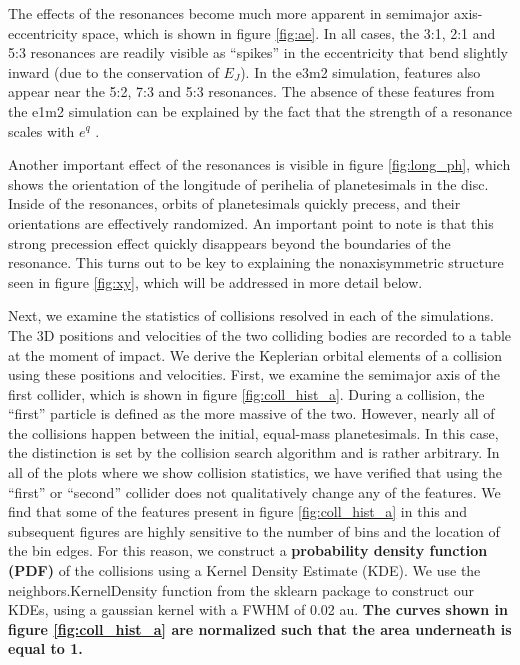 \documentclass[fleqn,usenatbib]{mnras}
\begin{document}
The effects of the resonances become much more apparent in semimajor axis-eccentricity space, which is shown in figure \ref{fig:ae}. In all cases, 
the 3:1, 2:1 and 5:3 resonances are readily visible as ``spikes'' in the eccentricity that bend slightly inward (due to the conservation of $E_{J}$). In the 
e3m2 simulation, features also appear near the 5:2, 7:3 and 5:3 resonances. The absence of these features from the e1m2 simulation can be 
explained by the fact that the strength of a resonance scales with $e^{q}$ \citep{1994PhyD...77..289M}.

Another important effect of the resonances is visible in figure \ref{fig:long_ph}, which shows the orientation of the longitude of perihelia of 
planetesimals in the disc. Inside of the resonances, orbits of planetesimals quickly precess, and their orientations are effectively randomized. An 
important point to note is that this strong precession effect quickly disappears beyond the boundaries of the resonance. This turns out to be 
key to explaining the nonaxisymmetric structure seen in figure \ref{fig:xy}, which will be addressed in more detail below.

Next, we examine the statistics of collisions resolved in each of the simulations. The 3D positions and velocities of the two colliding bodies are 
recorded to a table at the moment of impact. We derive the Keplerian orbital elements of a collision using these positions and velocities. 
First, we examine the semimajor axis of the first collider, which is shown in figure \ref{fig:coll_hist_a}. During a collision, the ``first'' particle is defined 
as the more massive of the two. However, nearly all of the collisions happen between the initial, equal-mass planetesimals. In this case, the 
distinction is set by the collision search algorithm and is rather arbitrary. In all of the plots where we show collision statistics, we have verified that 
using the ``first'' or ``second'' collider does not qualitatively change any of the features. We find that some of the features present in figure 
\ref{fig:coll_hist_a} in this and subsequent figures are highly sensitive to the number of bins and the location of the bin edges. For this reason, we 
construct a \textbf{probability density function (PDF)} of the collisions using a Kernel Density Estimate (KDE). We use the {\sc neighbors.KernelDensity} function from the {\sc sklearn} 
\citep{scikit-learn} package to construct our KDEs, using a gaussian kernel with a FWHM of 0.02 au. \textbf{The curves shown in figure \ref{fig:coll_hist_a} are normalized such that the area underneath is equal to 1.}
\end{document}
